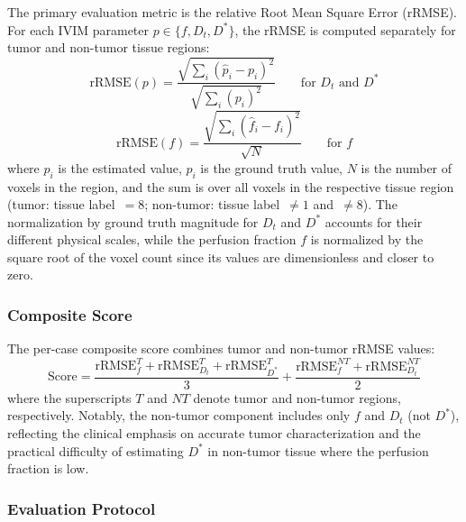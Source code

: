 \documentclass[12pt]{article}
\begin{document}
The primary evaluation metric is the relative Root Mean Square Error (rRMSE). For each IVIM parameter $p \in \{f, D_t, D^*\}$, the rRMSE is computed separately for tumor and non-tumor tissue regions:
\begin{equation}
\text{rRMSE}(p) = \frac{\sqrt{\sum_{i}(\hat{p}_i - p_i)^2}}{\sqrt{\sum_{i}(p_i)^2}} \qquad \text{for } D_t \text{ and } D^*
\label{eq:rrmse_dt_dstar}
\end{equation}
\begin{equation}
\text{rRMSE}(f) = \frac{\sqrt{\sum_{i}(\hat{f}_i - f_i)^2}}{\sqrt{N}} \qquad \text{for } f
\label{eq:rrmse_f}
\end{equation}
where $\hat{p}_i$ is the estimated value, $p_i$ is the ground truth value, $N$ is the number of voxels in the region, and the sum is over all voxels in the respective tissue region (tumor: tissue label~$=8$; non-tumor: tissue label~$\neq 1$ and~$\neq 8$). The normalization by ground truth magnitude for $D_t$ and $D^*$ accounts for their different physical scales, while the perfusion fraction $f$ is normalized by the square root of the voxel count since its values are dimensionless and closer to zero.

\subsubsection{Composite Score}

The per-case composite score combines tumor and non-tumor rRMSE values:
\begin{equation}
\text{Score} = \frac{\text{rRMSE}_f^T + \text{rRMSE}_{D_t}^T + \text{rRMSE}_{D^*}^T}{3} + \frac{\text{rRMSE}_f^{NT} + \text{rRMSE}_{D_t}^{NT}}{2}
\label{eq:composite}
\end{equation}
where the superscripts $T$ and $NT$ denote tumor and non-tumor regions, respectively. Notably, the non-tumor component includes only $f$ and $D_t$ (not $D^*$), reflecting the clinical emphasis on accurate tumor characterization and the practical difficulty of estimating $D^*$ in non-tumor tissue where the perfusion fraction is low.

\subsubsection{Evaluation Protocol}
\end{document}
